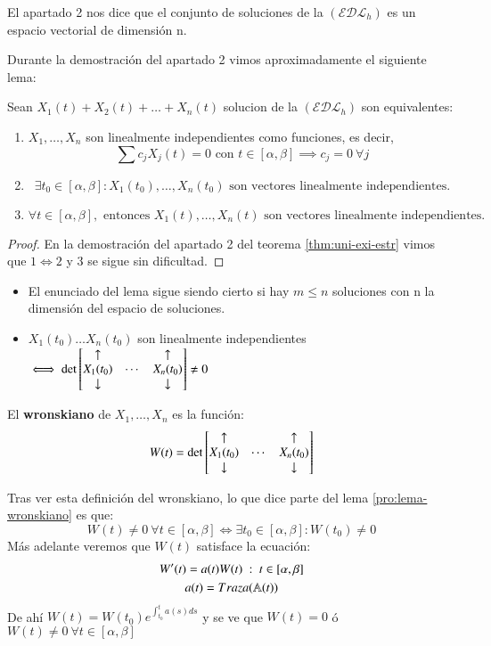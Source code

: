 \begin{obs}
    El apartado 2 nos dice que el conjunto de soluciones de la $(\mathcal{EDL}_h)$ es un espacio vectorial de dimensión n.
\end{obs}
Durante la demostración del apartado 2 vimos aproximadamente el siguiente lema:
\begin{pro}\label{pro:lema-wronskiano}
    Sean $X_1(t) + X_2(t) + \ldots + X_n(t)$ solucion de la $(\mathcal{EDL}_h)$ son equivalentes:\\
    \begin{enumerate}
        \item $X_1, \ldots, X_n$ son linealmente independientes como funciones, es decir,
        $$\sum c_j X_j (t) = 0 \text{ con } t \in [\alpha, \beta] \implies c_j = 0 \ \forall j$$
        \item
        $$
            \exists t_0 \in [\alpha, \beta] : X_1(t_0), \ldots, X_n(t_0) \text{ son vectores linealmente independientes.}
        $$
        \item
        $$
            \forall t \in [\alpha, \beta], \text{ entonces } X_1(t), \ldots, X_n(t) \text{ son vectores linealmente independientes.}
        $$
    \end{enumerate}
\end{pro}
\begin{proof}
    En la demostración del apartado 2 del teorema \ref{thm:uni-exi-estr} vimos que $1 \iff 2$ y $3$ se sigue sin dificultad.
\end{proof}
\begin{obs}
    \begin{itemize}
    \item El enunciado del lema sigue siendo cierto si hay $m \leq n$ soluciones con n la dimensión del espacio de soluciones.
    \item $X_1(t_0) \ldots X_n(t_0)$ son linealmente independientes $\iff \det \mx{\uparrow && \uparrow\\ X_1(t_0) & \cdots & X_n(t_0) \\ \downarrow && \downarrow} \neq 0$
    \end{itemize}
\end{obs}
\begin{dfn}[Wronskiano]\label{dfn:wronskiano}
    El \textbf{wronskiano} de $X_1,  \ldots, X_n$ es la función:
    $$
        W(t) = \det \mx{\uparrow && \uparrow\\ X_1(t_0) & \cdots & X_n(t_0) \\ \downarrow && \downarrow}
    $$
\end{dfn}
Tras ver esta definición del wronskiano, lo que dice parte del lema \ref{pro:lema-wronskiano} es que:
$$
    W(t) \neq 0\ \forall t \in [\alpha, \beta] \iff \exists t_0 \in [\alpha, \beta] : W(t_0) \neq 0
$$
Más adelante veremos que $W(t)$ satisface la ecuación:
\begin{gather*}
    W'(t) = a(t) W(t)\ :\ t\in [\alpha, \beta]\\
    a(t) = Traza(\mathbb{A}(t))
\end{gather*}
De ahí $W(t) = W(t_0) e^{\int_{t_0}^{t} a(s) ds}$ y se ve que $W(t) = 0$ ó $W(t) \neq 0\ \forall t\in [\alpha, \beta]$

